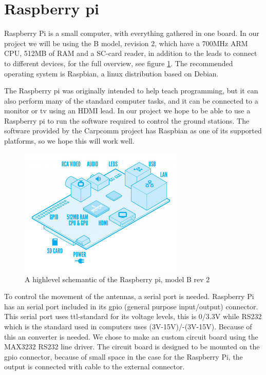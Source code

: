 \section{Raspberry pi}
Raspberry Pi is a small computer, with everything gathered in one board. In our project we will be using the B model, revision 2, which have a 700MHz ARM CPU, 512MB of RAM and a SC-card reader, in addition to the leads to connect to different devices, for  the full overview, see figure \ref{fig:raspberrypihighlevel}. The recommended operating system is Raspbian, a linux distribution based on Debian. 

The Raspberry pi was originally intended to help teach programming, but it can also perform many of the standard computer tasks, and it can be connected to a monitor or tv using an HDMI lead. In our project we hope to be able to use a Raspberry pi to run the software required to control the ground stations. The software provided by the Carpcomm project has Raspbian as one of its supported platforms, so we hope this will work well.

\begin{figure}
	\begin{center}
		\includegraphics[width=0.7\textwidth]{Figures/raspberrypi_modelb_hl.jpg}
	\end{center}
	\caption[Raspberry pi highlevel]{A highlevel schemantic of the Raspberry pi, model B rev 2}
	\label{fig:raspberrypihighlevel}
\end{figure}

To control the movement of the antennas, a serial port is needed. Raspberry Pi has an serial port included in its gpio (general purpose input/output) connector. This serial port uses ttl-standard for its voltage levels, this is 0/3.3V while RS232 which is the standard used in computers uses (3V-15V)/-(3V-15V). Because of this an converter is needed. We chose to make an custom circuit board using the MAX3232 RS232 line driver. The circuit board is designed to be mounted on the gpio connector, because of small space in the case for the Raspberry Pi, the output is connected with cable to the external connector.

